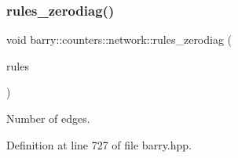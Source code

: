 \subsubsection{\texorpdfstring{rules\+\_\+zerodiag()}{rules\_zerodiag()}}
{\footnotesize\ttfamily void barry\+::counters\+::network\+::rules\+\_\+zerodiag (\begin{DoxyParamCaption}\item[{\hyperlink{namespacebarry_1_1counters_1_1network_adbdb20b3ce883777da2364984ea10c56}{Net\+Rules} $\ast$}]{rules }\end{DoxyParamCaption})\hspace{0.3cm}{\ttfamily [inline]}}



Number of edges. 



Definition at line 727 of file barry.\+hpp.

